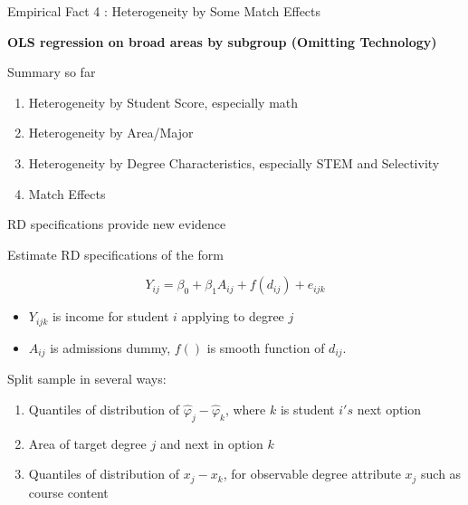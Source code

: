\documentclass[table,10pt]{beamer}
\begin{document}
\begin{frame}{Empirical Fact 4 : Heterogeneity by Some Match Effects }

\begin{center}
\textbf{OLS regression on broad areas by subgroup (Omitting Technology)}
\begin{tiny}
\end{tiny}
\end{center}
\end{frame}

\begin{frame}{Summary so far }

\begin{enumerate}
  \item<1> Heterogeneity by Student Score, especially math
  \item<2> Heterogeneity by Area/Major
  \item<3> Heterogeneity by Degree Characteristics, especially STEM and Selectivity
  \item<4> Match Effects
\end{enumerate}

\end{frame}



\begin{frame}{RD specifications provide new evidence}


Estimate RD specifications of the form

$$
Y_{ij}=\beta_0+\beta_1 A_{ij}+f(d_{ij})+e_{ijk}
$$
\begin{itemize}
\item $Y_{ijk}$ is income for student $i$ applying to degree $j$
\item $A_{ij}$ is admissions dummy, $f()$ is smooth function of $d_{ij}$.
\end{itemize}

\medskip

Split sample in several ways:
\begin{enumerate}
\item Quantiles of distribution of $\hat{\varphi}_j-\hat{\varphi}_k$, where $k$ is student $i's$ next option
\item Area of target degree $j$ and next in option $k$
\item Quantiles of distribution of $x_j-x_k$, for observable degree attribute $x_j$ such as course content
\end{enumerate}




\end{frame}
\end{document}
